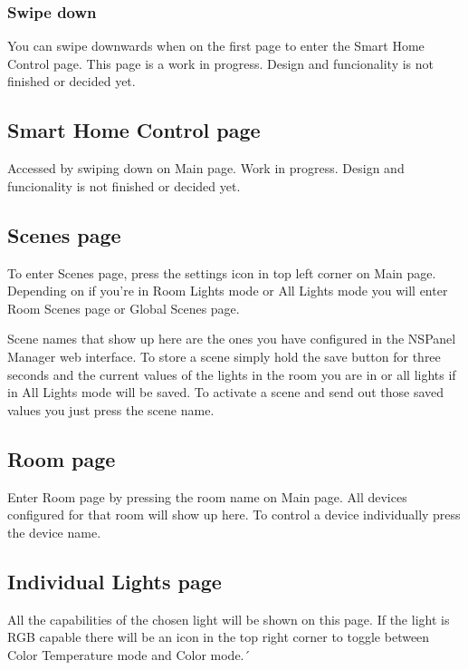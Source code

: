 \documentclass[10pt]{article}
\begin{document}
    \subsubsection{Swipe down}
    You can swipe downwards when on the first page to enter the Smart Home Control page.
    This page is a work in progress. Design and funcionality is not finished or decided yet.
    \subsection{Smart Home Control page}
    Accessed by swiping down on Main page. Work in progress. Design and funcionality is not finished or decided yet.  
    \subsection{Scenes page}
    To enter Scenes page, press the settings icon in top left corner on Main page. Depending on if you're in Room Lights mode or All Lights mode you will enter Room Scenes page or Global Scenes page.
    
    Scene names that show up here are the ones you have configured in the NSPanel Manager web interface. To store a scene simply hold the save button for three seconds and the current values of the lights in the room you are in or all lights if in All Lights mode will be saved. To activate a scene and send out those saved values you just press the scene name.
    \subsection{Room page}
	Enter Room page by pressing the room name on Main page. All devices configured for that room will show up here. To control a device individually press the device name. 
    \subsection{Individual Lights page}
    All the capabilities of the chosen light will be shown on this page. If the light is RGB capable there will be an icon in the top right corner to toggle between Color Temperature mode and Color mode.´

    \clearpage
\end{document}
